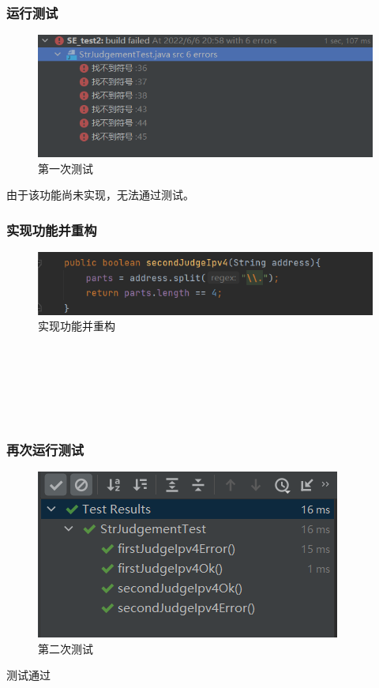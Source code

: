 \documentclass[a4paper]{article}
\begin{document}
\subsubsection*{运行测试}
\begin{figure}[h]
    \centering
    \includegraphics[scale=0.9]{2.3.png}
    \caption{第一次测试}
    \label{fig:9}
\end{figure}
由于该功能尚未实现，无法通过测试。
\subsubsection*{实现功能并重构}
\begin{figure}[h]
    \centering
    \includegraphics[scale=0.8]{2.4.png}
    \caption{实现功能并重构}
    \label{fig:10}
\end{figure}
~\\~\\~\\~\\~\\
\subsubsection*{再次运行测试}
\begin{figure}[h]
    \centering
    \includegraphics[scale=0.9]{2.5.png}
    \caption{第二次测试}
    \label{fig:11}
\end{figure}
测试通过
\end{document}
